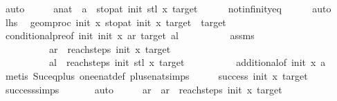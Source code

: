 \begin{isabellebody}
\ auto\isanewline
\ \ \isamarkupfalse%
\ \isamarkupfalse%
\ a{\isacharcolon}{\kern0pt}{\isacharcolon}{\kern0pt}nat\ \ {\isachardoublequoteopen}a\ {\isacharequal}{\kern0pt}\ stop{\isacharunderscore}{\kern0pt}at\ init{\isacharprime}{\kern0pt}\ {\isacharparenleft}{\kern0pt}stl\ x{\isacharparenright}{\kern0pt}\ target{\isachardoublequoteclose}\isanewline
\ \ \ \ \isamarkupfalse%
\ not{\isacharunderscore}{\kern0pt}infinity{\isacharunderscore}{\kern0pt}eq\isanewline
\ \ \ \ \isamarkupfalse%
\ auto\isanewline
\ \ \isamarkupfalse%
\ lhs{}\ \isamarkupfalse%
\ {\isachardoublequoteopen}geom{\isacharunderscore}{\kern0pt}proc\ init\ x\ {\isacharparenleft}{\kern0pt}stop{\isacharunderscore}{\kern0pt}at\ init\ x\ target{\isacharparenright}{\kern0pt}\ {\isacharequal}{\kern0pt}\ target{\isachardoublequoteclose}\isanewline
\ \ \ \ \isamarkupfalse%
\ conditional{}{\isacharunderscore}{\kern0pt}pre{\isacharbrackleft}{\kern0pt}of\ init{\isacharprime}{\kern0pt}\ init\ x\ ar\ target\ al{\isacharbrackright}{\kern0pt}\isanewline
\ \ \ \ \ \ \ \ \ \ assms\isanewline
\ \ \ \ \ \ \ \ \ \ {\isacartoucheopen}ar\ {\isacharequal}{\kern0pt}\ reach{\isacharunderscore}{\kern0pt}steps\ init\ x\ target{\isacartoucheclose}\isanewline
\ \ \ \ \ \ \ \ \ \ {\isacartoucheopen}al\ {\isacharequal}{\kern0pt}\ reach{\isacharunderscore}{\kern0pt}steps\ init{\isacharprime}{\kern0pt}\ {\isacharparenleft}{\kern0pt}stl\ x{\isacharparenright}{\kern0pt}\ target{\isacartoucheclose}\isanewline
\ \ \ \ \ \ \ \ \ \ additional{}{\isacharbrackleft}{\kern0pt}of\ init\ x\ a{\isacharbrackright}{\kern0pt}\isanewline
\ \ \ \ \isamarkupfalse%
\ {\isacharparenleft}{\kern0pt}metis\ Suc{\isacharunderscore}{\kern0pt}eq{\isacharunderscore}{\kern0pt}plus{}\ one{\isacharunderscore}{\kern0pt}enat{\isacharunderscore}{\kern0pt}def\ plus{\isacharunderscore}{\kern0pt}enat{\isacharunderscore}{\kern0pt}simps{\isacharparenleft}{\kern0pt}{}{\isacharparenright}{\kern0pt}{\isacharparenright}{\kern0pt}\isanewline
\ \ \isamarkupfalse%
\ \isamarkupfalse%
\ {\isachardoublequoteopen}success\ init\ x\ target{\isachardoublequoteclose}\isanewline
\ \ \ \ \isamarkupfalse%
\ success{\isachardot}{\kern0pt}simps\ \isanewline
\ \ \ \ \isamarkupfalse%
\ auto\isanewline
{}\isamarkupfalse%
\ \isanewline
\ \ \isamarkupfalse%
\ ar\ \ {\isachardoublequoteopen}ar\ {\isacharequal}{\kern0pt}\ reach{\isacharunderscore}{\kern0pt}steps\ init\ x\ target{\isachardoublequoteclose}\isanewline

\end{isabellebody}
